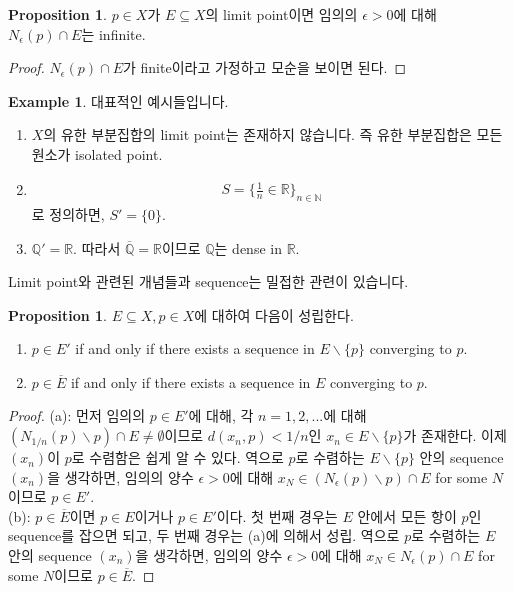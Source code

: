 \documentclass[12pt]{article}
\theoremstyle{definition}
\newtheorem{prop}[thm]{Proposition}
\newtheorem*{ex}{Example}
\def\NN{\mathbb{N}}
\def\QQ{\mathbb{Q}}
\def\RR{\mathbb{R}}
\def\eps{\epsilon}
\begin{document}
	\begin{prop}
		\(p \in X\)가 \(E \subseteq X\)의 limit point이면 임의의 \(\eps > 0\)에 대해 \(N_\eps (p) \cap E\)는 infinite.
	\end{prop}
	\begin{proof}
		\(N_\eps (p) \cap E\)가 finite이라고 가정하고 모순을 보이면 된다.
	\end{proof}

	\begin{ex}
		대표적인 예시들입니다.
		\begin{enumerate}[label=(\alph*), leftmargin=2\parindent]
			\item
			\(X\)의 유한 부분집합의 limit point는 존재하지 않습니다. 즉 유한 부분집합은 모든 원소가 isolated point.
			\item
			\begin{gather*}
				S = \{\frac{1}{n} \in \RR\}_{n \in \NN}
			\end{gather*}
			로 정의하면, \(S'=\{0\}\).
			\item
			\(\QQ' = \RR\). 따라서 \(\overline{\QQ} = \RR\)이므로 \(\QQ\)는 dense in \(\RR\).
		\end{enumerate}
	\end{ex}

Limit point와 관련된 개념들과 sequence는 밀접한 관련이 있습니다.

	\begin{prop} \label{prop limpt seq}
		\(E \subseteq X, p \in X\)에 대하여 다음이 성립한다.
		\begin{enumerate}[label=(\alph*), leftmargin=2\parindent]
			\item
			\(p \in E'\) if and only if there exists a sequence in \(E \backslash \{p\}\) converging to \(p\).
			\item
			\(p \in \overline{E}\) if and only if there exists a sequence in \(E\) converging to \(p\).
		\end{enumerate}
	\end{prop}

	\begin{proof}
		(a): 먼저 임의의 \(p \in E'\)에 대해, 각 \(n = 1, 2, ...\)에 대해 \((N_{1/n} (p) \backslash {p}) \cap E \neq \emptyset\)이므로 \(d(x_n, p) < 1/n\)인 \(x_n \in E \backslash \{p\}\)가 존재한다. 이제 \((x_n)\)이 \(p\)로 수렴함은 쉽게 알 수 있다. 역으로 \(p\)로 수렴하는 \(E \backslash \{p\}\) 안의 sequence \((x_n)\)을 생각하면, 임의의 양수 \(\eps > 0\)에 대해 \(x_N \in (N_\eps (p) \backslash {p}) \cap E\) for some \(N\)이므로 \(p \in E'\).\\
		(b): \(p \in \overline{E}\)이면 \(p \in E\)이거나 \(p \in E'\)이다. 첫 번째 경우는 \(E\) 안에서 모든 항이 \(p\)인 sequence를 잡으면 되고, 두 번째 경우는 (a)에 의해서 성립. 역으로 \(p\)로 수렴하는 \(E\) 안의 sequence \((x_n)\)을 생각하면, 임의의 양수 \(\eps > 0\)에 대해 \(x_N \in N_\eps (p) \cap E\) for some \(N\)이므로 \(p \in \overline{E}\).
	\end{proof}
\end{document}
